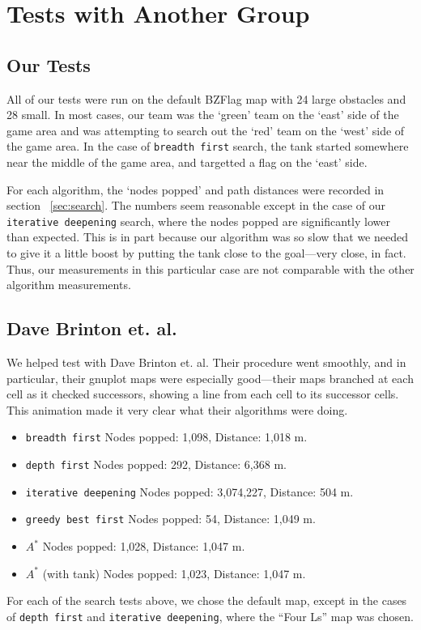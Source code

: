 \section{Tests with Another Group}
\subsection{Our Tests}
All of our tests were run on the default BZFlag map with 24 large obstacles and 28 small.  In most cases, our team was the `green' team on the `east' side of the game area and was attempting to search out the `red' team on the `west' side of the game area.  In the case of \texttt{breadth first} search, the tank started somewhere near the middle of the game area, and targetted a flag on the `east' side.
\par
For each algorithm, the `nodes popped' and path distances were recorded in section ~\ref{sec:search}.  The numbers seem reasonable except in the case of our \texttt{iterative deepening} search, where the nodes popped are significantly lower than expected.  This is in part because our algorithm was so slow that we needed to give it a little boost by putting the tank close to the goal---very close, in fact.  Thus, our measurements in this particular case are not comparable with the other algorithm measurements.

\subsection{Dave Brinton et. al.}
We helped test with Dave Brinton et. al.  Their procedure went smoothly, and in particular, their gnuplot maps were especially good---their maps branched at each cell as it checked successors, showing a line from each cell to its successor cells.  This animation made it very clear what their algorithms were doing.
\par

\begin{itemize}
    \item \texttt{breadth first}	Nodes popped: 1,098, Distance: 1,018 m.
    \item \texttt{depth first}	Nodes popped: 292, Distance: 6,368 m.
    \item \texttt{iterative deepening}	Nodes popped: 3,074,227, Distance: 504 m.
    \item \texttt{greedy best first}	Nodes popped: 54, Distance: 1,049 m.
    \item $A^*$	Nodes popped: 1,028, Distance: 1,047 m.
    \item $A^*$ (with tank) Nodes popped: 1,023, Distance: 1,047 m.
\end{itemize}

For each of the search tests above, we chose the default map, except in the cases of \texttt{depth first} and \texttt{iterative deepening}, where the ``Four Ls'' map was chosen.







